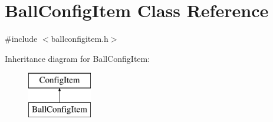 \hypertarget{classBallConfigItem}{\section{Ball\-Config\-Item Class Reference}
\label{classBallConfigItem}
}


{\ttfamily \#include $<$ballconfigitem.\-h$>$}

Inheritance diagram for Ball\-Config\-Item\-:\begin{figure}[H]
\begin{center}
\leavevmode
\includegraphics[height=2.000000cm]{classBallConfigItem}
\end{center}
\end{figure}
